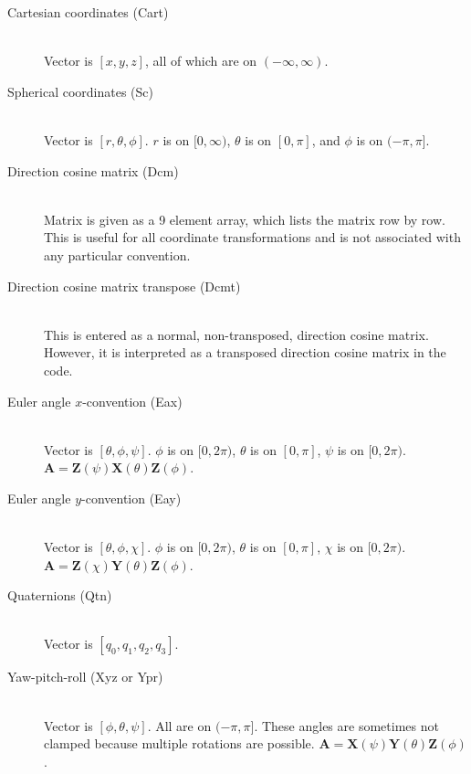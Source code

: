 \documentclass[11pt]{article}
\begin{document}
\begin{description}

\item[Cartesian coordinates (Cart)]
\hfill \\
Vector is $[x,y,z]$, all of which are on $(-\infty,\infty)$.

\item[Spherical coordinates (Sc)]
\hfill \\
Vector is $[r,\theta,\phi]$. $r$ is on $[0,\infty)$, $\theta$ is on $[0,\pi]$, and $\phi$ is on $(-\pi,\pi]$.

\item[Direction cosine matrix (Dcm)]
\hfill \\
Matrix is given as a 9 element array, which lists the matrix row by row. This is useful for all coordinate transformations and is not associated with any particular convention.

\item[Direction cosine matrix transpose (Dcmt)]
\hfill \\
This is entered as a normal, non-transposed, direction cosine matrix. However, it is interpreted as a transposed direction cosine matrix in the code.

\item[Euler angle $x$-convention (Eax)]
\hfill \\
Vector is $[\theta,\phi,\psi]$. $\phi$ is on $[0,2\pi)$, $\theta$ is on $[0,\pi]$, $\psi$ is on $[0,2\pi)$. $\bm{A} = \bm{Z}(\psi)\bm{X}(\theta)\bm{Z}(\phi)$.

\item[Euler angle $y$-convention (Eay)]
\hfill \\
Vector is $[\theta,\phi,\chi]$. $\phi$ is on $[0,2\pi)$, $\theta$ is on $[0,\pi]$, $\chi$ is on $[0,2\pi)$. $\bm{A} = \bm{Z}(\chi)\bm{Y}(\theta)\bm{Z}(\phi)$.

\item[Quaternions (Qtn)]
\hfill \\
Vector is $[q_0,q_1,q_2,q_3]$.

\item[Yaw-pitch-roll (Xyz or Ypr)]
\hfill \\
Vector is $[\phi,\theta,\psi]$. All are on $(-\pi,\pi]$. These angles are sometimes not clamped because multiple rotations are possible. $\bm{A} = \bm{X}(\psi)\bm{Y}(\theta)\bm{Z}(\phi)$.

\end{description}
\end{document}
